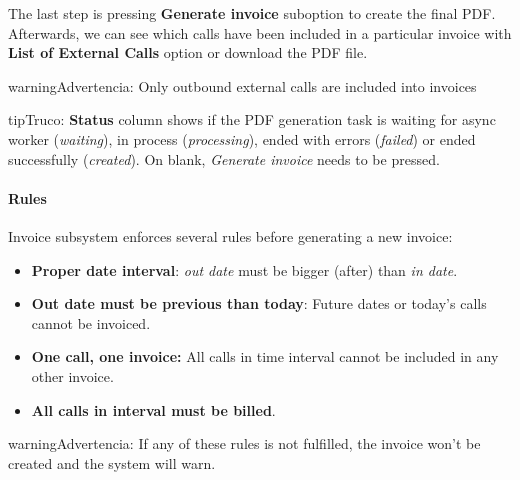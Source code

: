 \documentclass[letterpaper,10pt,spanish]{sphinxmanual}
\begin{document}
The last step is pressing \textbf{Generate invoice} suboption to create the final PDF. Afterwards, we can see which calls have been
included in a particular invoice with \textbf{List of External Calls} option or download the PDF file.

\begin{notice}{warning}{Advertencia:}
Only outbound external calls are included into invoices
\end{notice}

\begin{notice}{tip}{Truco:}
\textbf{Status} column shows if the PDF generation task is waiting for async worker (\emph{waiting}), in process (\emph{processing}),
ended with errors (\emph{failed}) or ended successfully (\emph{created}). On blank, \emph{Generate invoice} needs to be pressed.
\end{notice}


\paragraph{Rules}
\label{administration_portal/brand/invoicing/invoices:rules}
Invoice subsystem enforces several rules before generating a new invoice:
\begin{itemize}
\item {} 
\textbf{Proper date interval}: \emph{out date} must be bigger (after) than \emph{in date}.

\item {} 
\textbf{Out date must be previous than today}: Future dates or today's calls cannot be invoiced.

\item {} 
\textbf{One call, one invoice:} All calls in time interval cannot be included in any other invoice.

\item {} 
\textbf{All calls in interval must be billed}.

\end{itemize}

\begin{notice}{warning}{Advertencia:}
If any of these rules is not fulfilled, the invoice won't be created and the system will warn.
\end{notice}
\end{document}
